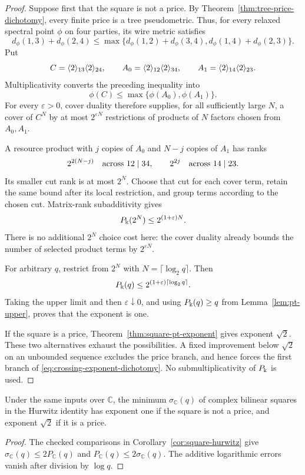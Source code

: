\begin{proof}
Suppose first that the square is not a price.
By Theorem~\ref{thm:tree-price-dichotomy}, every finite price
is a tree pseudometric. Thus, for every relaxed spectral point
\(\phi\) on four parties, its wire metric satisfies
\[
 d_\phi(1,3)+d_\phi(2,4)
 \leq
 \max\{d_\phi(1,2)+d_\phi(3,4),
        d_\phi(1,4)+d_\phi(2,3)\}.
\]
Put
\[
 C=\langle 2\rangle_{13}\langle 2\rangle_{24},\qquad
 A_0=\langle 2\rangle_{12}\langle 2\rangle_{34},\qquad
 A_1=\langle 2\rangle_{14}\langle 2\rangle_{23}.
\]
Multiplicativity converts the preceding inequality into
\[
 \phi(C)\leq\max\{\phi(A_0),\phi(A_1)\}.
\]
For every \(\varepsilon>0\), cover duality therefore supplies,
for all sufficiently large \(N\), a cover of \(C^N\) by at most
\(2^{\varepsilon N}\) restrictions of products of \(N\) factors
chosen from \(A_0,A_1\).

A resource product with \(j\) copies of \(A_0\) and \(N-j\)
copies of \(A_1\) has ranks
\[
 2^{2(N-j)}\quad\hbox{across }12\mid34,
 \qquad
 2^{2j}\quad\hbox{across }14\mid23.
\]
Its smaller cut rank is at most \(2^N\). Choose that cut for
each cover term, retain the same bound after its local restriction,
and group terms according to the chosen cut. Matrix-rank
subadditivity gives
\begin{equation}\label{eq:tree-crossing-cover-cost}
 P_\Bbbk(2^N)\leq2^{(1+\varepsilon)N}.
\end{equation}
There is no additional \(2^N\) choice cost here: the cover
duality already bounds the number of selected product terms by
\(2^{\varepsilon N}\).

For arbitrary \(q\), restrict from \(2^N\) with
\(N=\lceil\log_2q\rceil\). Then
\[
 P_\Bbbk(q)\leq
 2^{(1+\varepsilon)\lceil\log_2q\rceil}.
\]
Taking the upper limit and then \(\varepsilon\downarrow0\),
and using \(P_\Bbbk(q)\geq q\) from Lemma~\ref{lem:pt-upper},
proves that the exponent is one.

If the square is a price, Theorem~\ref{thm:square-pt-exponent}
gives exponent \(\sqrt2\). These two alternatives exhaust the
possibilities. A fixed improvement below \(\sqrt2\) on an unbounded
sequence excludes the price branch, and hence forces the first
branch of \eqref{eq:crossing-exponent-dichotomy}.
No submultiplicativity of \(P_\Bbbk\) is used.
\end{proof}

\begin{corollary}
\label{cor:hurwitz-exponent-dichotomy}
Under the same inputs over \(\mathbb C\), the minimum
\(\sigma_\mathbb C(q)\) of complex bilinear squares in the
Hurwitz identity has exponent one if the square is not a price,
and exponent \(\sqrt2\) if it is a price.
\end{corollary}
\begin{proof}
The checked comparisons in Corollary~\ref{cor:square-hurwitz}
give
\(\sigma_\mathbb C(q)\leq2P_\mathbb C(q)\) and
\(P_\mathbb C(q)\leq2\sigma_\mathbb C(q)\).
The additive logarithmic errors vanish after division by \(\log q\).
\end{proof}

